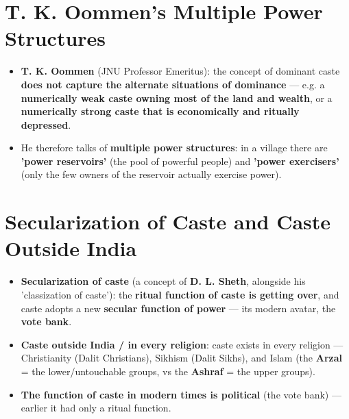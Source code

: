 \section{T. K. Oommen's Multiple Power Structures}

\begin{KeyConcept}
\begin{itemize}
\item \textbf{T. K. Oommen} (JNU Professor Emeritus): the concept of dominant caste \textbf{does not capture the alternate situations of dominance} --- e.g. a \textbf{numerically weak caste owning most of the land and wealth}, or a \textbf{numerically strong caste that is economically and ritually depressed}.
\item He therefore talks of \textbf{multiple power structures}: in a village there are \textbf{'power reservoirs'} (the pool of powerful people) and \textbf{'power exercisers'} (only the few owners of the reservoir actually exercise power).
\end{itemize}
\end{KeyConcept}

\section{Secularization of Caste and Caste Outside India}

\begin{KeyConcept}
\begin{itemize}
\item \textbf{Secularization of caste} (a concept of \textbf{D. L. Sheth}, alongside his 'classization of caste'): the \textbf{ritual function of caste is getting over}, and caste adopts a new \textbf{secular function of power} --- its modern avatar, the \textbf{vote bank}.
\item \textbf{Caste outside India / in every religion}: caste exists in every religion --- Christianity (Dalit Christians), Sikhism (Dalit Sikhs), and Islam (the \textbf{Arzal} = the lower/untouchable groups, vs the \textbf{Ashraf} = the upper groups).
\item \textbf{The function of caste in modern times is political} (the vote bank) --- earlier it had only a ritual function.
\end{itemize}
\end{KeyConcept}

